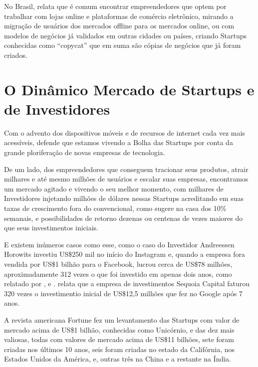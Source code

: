 No Brasil,  relata que é comum encontrar empreendedores que optem por trabalhar com lojas online e plataformas de comércio eletrônico, mirando a migração de usuários dos mercados offline para os mercados online, ou com modelos de negócios já validados em outras cidades ou países, criando Startups conhecidas como ``copycat'' que em suma são cópias de negócios que já foram criados.

\section{O Dinâmico Mercado de Startups e de Investidores}
\label{section:o_dinamico_mercado_das_startups}

Com o advento dos dispositivos móveis e de recursos de internet cada vez mais acessíveis,  defende que estamos vivendo a Bolha das Startups por conta da grande ploriferação de novas empresas de tecnologia. 

De um lado, dos empreendedores que conseguem tracionar seus produtos, atrair milhares e até mesmo milhões de usuários e escalar suas empresas, encontramos um mercado agitado e vivendo o seu melhor momento, com milhares de Investidores injetando milhões de dólares nessas Startups acreditando em suas taxas de crescimento fora do convencional, como  sugere na casa dos 10\% semanais, e possibilidades de retorno dezenas ou centenas de vezes maiores do que seus investimentos iniciais.

E existem inúmeros casos como esse, como o caso do Investidor Andreessen Horowits investiu US\$250 mil no início do Instagram e, quando a empresa fora vendida por US\$1 bilhão para o Facebook, lucrou cerca de US\$78 milhões, aproximadamente 312 vezes o que foi investido em apenas dois anos, como relatado por ,  e .  relata que a empresa de investimentos Sequoia Capital faturou 320 vezes o investimentio inicial de US\$12,5 milhões que fez no Google após 7 anos.

A revista americana Fortune fez um levantamento das Startups com valor de mercado acima de US\$1 bilhão, conhecidas como Unicórnio, e das dez mais valiosas, todas com valores de mercado acima de US\$11 bilhões, sete foram criadas nos últimos 10 anos, seis foram criadas no estado da Califórnia, nos Estados Unidos da América, e, outras três na China e a restante na Índia.


